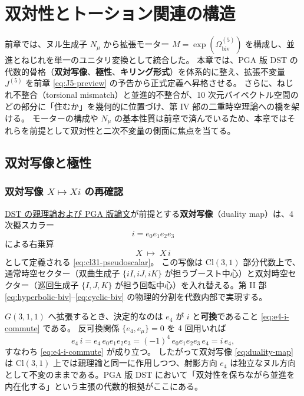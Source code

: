 \documentclass[dvipdfmx,a4paper,oneside]{jsbook}
\numberwithin{equation}{chapter}
\begin{document}
\chapter{双対性とトーション関連の構造}

前章では、ヌル生成子 \(N_\mu\) から拡張モーター \(M = \exp(\Omega_{\mathrm{biv}}^{(5)})\) を構成し、並進とねじれを単一のユニタリ変換として統合した。
本章では、PGA 版 DST の代数的骨格（\textbf{双対写像}、\textbf{極性}、\textbf{キリング形式}）を体系的に整え、拡張不変量 \(J^{(5)}\) を前章 \eqref{eq:J5-preview} の予告から正式定義へ昇格させる。
さらに、ねじれ不整合（torsional mismatch）と並進的不整合が、10 次元バイベクトル空間のどの部分に「住むか」を幾何的に位置づけ、第 IV 部の二重時空理論への橋を架ける。
モーターの構成や \(N_\mu\) の基本性質は前章で済んでいるため、本章ではそれらを前提として双対性と二次不変量の側面に焦点を当てる。

\section{双対写像と極性}

\subsection{双対写像 \(X \mapsto Xi\) の再確認}

\hyperref[sec:sister-manuscripts]{DST の親理論および PGA 版論文}が前提とする\textbf{双対写像}（duality map）は、4 次擬スカラー
\begin{equation}
  i = e_0 e_1 e_2 e_3
  \label{eq:duality-pseudoscalar}
\end{equation}
による右乗算
\begin{equation}
  X \;\longmapsto\; X\, i
  \label{eq:duality-map}
\end{equation}
として定義される \eqref{eq:cl31-pseudoscalar}。
この写像は \(\mathrm{Cl}(3,1)\) 部分代数上で、通常時空セクター（双曲生成子 \(\{iI,iJ,iK\}\) が担うブースト中心）と双対時空セクター（巡回生成子 \(\{I,J,K\}\) が担う回転中心）を入れ替える。第 II 部 \eqref{eq:hyperbolic-biv}–\eqref{eq:cyclic-biv} の物理的分割を代数内部で実現する。

\(G(3,1,1)\) へ拡張するとき、決定的なのは \(e_4\) が \(i\) と\textbf{可換}であること \eqref{eq:e4-i-commute} である。
反可換関係 \(\{e_4, e_\mu\} = 0\) を 4 回用いれば
\begin{equation}
  e_4\, i = e_4\, e_0 e_1 e_2 e_3 = (-1)^4\, e_0 e_1 e_2 e_3\, e_4 = i\, e_4,
\end{equation}
すなわち \eqref{eq:e4-i-commute} が成り立つ。
したがって双対写像 \eqref{eq:duality-map} は \(\mathrm{Cl}(3,1)\) 上では親理論と同一に作用しつつ、射影方向 \(e_4\) は独立なヌル方向として不変のままである。PGA 版 DST において「双対性を保ちながら並進を内在化する」という主張の代数的根拠がここにある。
\end{document}
